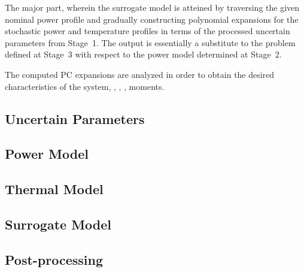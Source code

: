  The major part, wherein the surrogate model is atteined by traversing the given nominal power profile and gradually constructing polynomial expansions for the stochastic power and temperature profiles in terms of the processed uncertain parameters from Stage~1. The output is essentially a substitute to the problem defined at Stage~3 with respect to the power model determined at Stage~2.

 The computed PC expansions are analyzed in order to obtain the desired characteristics of the system, \eg, \cdfs, \pdfs, moments.

\subsection{Uncertain Parameters} 


\subsection{Power Model} 


\subsection{Thermal Model} 


\subsection{Surrogate Model} 


\subsection{Post-processing} 

